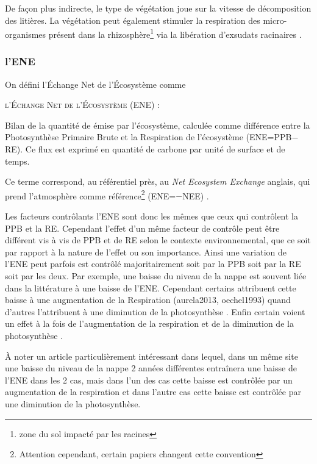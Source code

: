 De façon plus indirecte, le type de végétation joue sur la vitesse de décomposition des litières.
La végétation peut également stimuler la respiration des micro-organismes présent dans la rhizosphère\footnote{zone du sol impacté par les racines} via la libération d'exsudats racinaires \citep{moore2002}.

\subsubsection{l'ENE}


On défini l'Échange Net de l'Écosystème comme 

\begin{pdef}
\textsc{l'Échange Net de l'Écosystème (ENE)} :

Bilan de la quantité de \coo émise par l'écosystème, calculée comme  différence entre la Photosynthèse Primaire Brute et la Respiration de l'écosystème (ENE=PPB$-$RE).
Ce flux est exprimé en quantité de carbone par unité de surface et de temps.
\end{pdef}
Ce terme correspond, au référentiel près, au \textit{Net Ecosystem Exchange} anglais, qui prend l'atmosphère comme référence\footnote{Attention cependant, certain papiers changent cette convention} (ENE=$-$NEE) \citep{chapin2006}.

Les facteurs contrôlants l'ENE sont donc les mêmes que ceux qui contrôlent la PPB et la RE.
Cependant l'effet d'un même facteur de contrôle peut être différent vis à vis de PPB et de RE selon le contexte environnemental, que ce soit par rapport à la nature de l'effet ou son importance.
Ainsi une variation de l'ENE peut parfois est contrôlé majoritairement soit par la PPB soit par la RE soit par les deux.
Par exemple, une baisse du niveau de la nappe est souvent liée dans la littérature à une baisse de l'ENE.
Cependant certains attribuent cette baisse à une augmentation de la Respiration \citep{alm1999, ise2008} (aurela2013, oechel1993) quand d'autres l'attribuent à une diminution de la photosynthèse \citep{sonnentag2010,peichl2014}.
Enfin certain voient un effet à la fois de l'augmentation de la respiration et de la diminution de la photosynthèse \citep{strack2013}.

À noter un article particulièrement intéressant \citep{lund2012} dans lequel, dans un même site une baisse du niveau de la nappe 2 années différentes entraînera une baisse de l'ENE dans les 2 cas, mais dans l'un des cas cette baisse est contrôlée par un augmentation de la respiration et dans l'autre cas cette baisse est contrôlée par une diminution de la photosynthèse.

